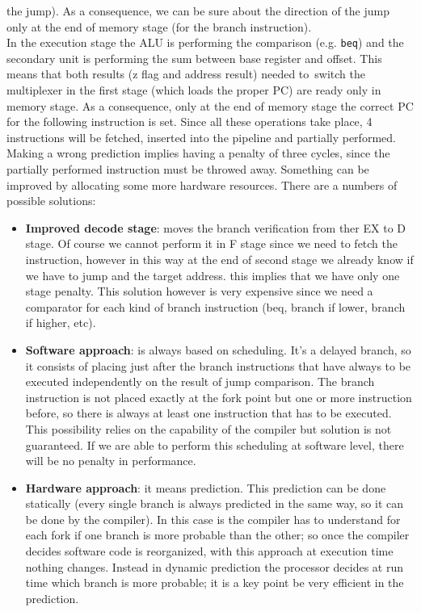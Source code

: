 the jump). As a consequence, we can be sure about the direction of the jump
only at the end of memory stage (for the branch instruction).\\In the execution
stage the ALU is performing the comparison (e.g. \verb|beq|) and the secondary
unit is performing the sum between base register and offset. This means that
both results (z flag and address result) needed to switch the multiplexer in
the first stage (which loads the proper PC) are ready only in memory stage. As
a consequence, only at the end of memory stage the correct PC for the
following instruction is set. Since all these operations take place, 4
instructions will be fetched, inserted into the pipeline and partially
performed.\\
Making a wrong prediction implies having a penalty of three cycles, since the
partially performed instruction must be throwed away. Something can be improved
by allocating some more hardware resources. There are a numbers of possible
solutions:
\begin{itemize}
  \item \textbf{Improved decode stage}: moves the branch verification from ther
    EX to D stage. Of course we cannot perform it in F stage since we need to
    fetch the instruction, however in this way at the end of second stage we
    already know if we have to jump and the target address. this implies that
    we have only one stage penalty. This solution however is very expensive
    since we need a comparator for each kind of branch instruction
    (beq, branch if lower, branch if higher, etc).
  \item \textbf{Software approach}: is always based on scheduling. It's a
    delayed branch, so it consists of placing just after the branch instructions
    that have always to be executed independently on the result of jump
    comparison. The branch instruction is not placed exactly at the fork point
    but one or more instruction before, so there is always at least one
    instruction that has to be executed. This possibility relies on the
    capability of the compiler but solution is not guaranteed. If we are able to
    perform this scheduling at software level, there will be no penalty in
    performance.
  \item \textbf{Hardware approach}: it means prediction. This prediction can be
    done statically (every single branch is always predicted in the same way, so
    it can be done by the compiler). In this case is the compiler has to
    understand for each fork if one branch is more probable than the other; so
    once the compiler decides software code is reorganized, with this approach
    at execution time nothing changes. Instead in dynamic prediction the
    processor decides at run time which branch is more probable; it is a key
    point be very efficient in the prediction.
\end{itemize}
